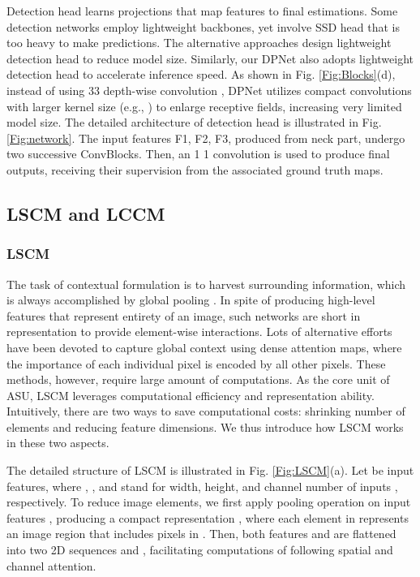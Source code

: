 \documentclass[lettersize,journal]{IEEEtran}
\begin{document}
Detection head learns projections that map features to final estimations. Some detection networks \cite{howard2017mobilenets,sandler2018mobilenetv2} employ lightweight backbones, yet involve SSD head \cite{liu2016ssd} that is too heavy to make predictions. The alternative approaches \cite{qin2019thundernet,li2018tiny,Pelee} design lightweight detection head to reduce model size. Similarly, our DPNet also adopts lightweight detection head to accelerate inference speed. As shown in Fig. \ref{Fig:Blocks}(d), instead of using 33 depth-wise convolution \cite{qin2019thundernet,li2018tiny,Pelee}, DPNet utilizes compact convolutions with larger kernel size (e.g., ) to enlarge receptive fields, increasing very limited model size. The detailed architecture of detection head is illustrated in Fig. \ref{Fig:network}. The input features F1, F2, F3, produced from neck part, undergo two successive ConvBlocks. Then, an 1  1 convolution is used to produce final outputs, receiving their supervision from the associated ground truth maps.

\subsection{LSCM and LCCM}



\subsubsection{LSCM}

The task of contextual formulation is to harvest surrounding information, which is always accomplished by global pooling \cite{hu2018genet,woo2018cbam,ecanet}. In spite of producing high-level features that represent entirety of an image, such networks are short in representation to provide element-wise interactions. Lots of alternative efforts \cite{vaswani2017attention,wang2018non,liu2021Swin} have been devoted to capture global context using dense attention maps, where the importance of each individual pixel is encoded by all other pixels. These methods, however, require large amount of computations. As the core unit of ASU, LSCM leverages computational efficiency and representation ability. Intuitively, there are two ways to save computational costs: shrinking number of elements and reducing feature dimensions. We thus introduce how LSCM works in these two aspects.



The detailed structure of LSCM is illustrated in Fig. \ref{Fig:LSCM}(a). Let  be input features, where , , and  stand for width, height, and channel number of inputs , respectively. To reduce image elements, we first apply pooling operation on input features , producing a compact representation , where each element in  represents an image region that includes  pixels in . Then, both features  and  are flattened into two 2D sequences  and , facilitating computations of following spatial and channel attention.
\end{document}
